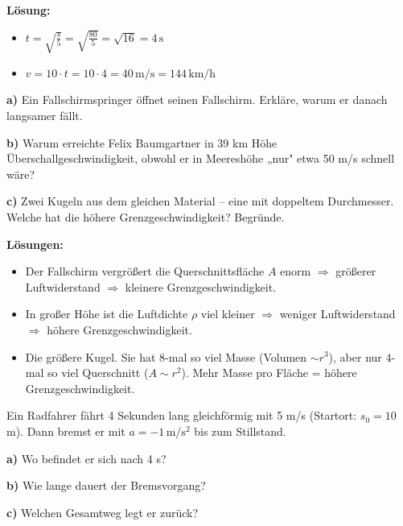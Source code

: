 \documentclass[11pt,a4paper]{article}
\begin{document}
\textbf{Lösung:}
\begin{itemize}
\item[a)] $t = \sqrt{\frac{s}{5}} = \sqrt{\frac{80}{5}} = \sqrt{16} = 4\,\mathrm{s}$
\item[b)] $v = 10 \cdot t = 10 \cdot 4 = 40\,\mathrm{m/s} = 144\,\mathrm{km/h}$
\end{itemize}

\vspace{0.5cm}

\begin{aufgabe}
\textbf{a)} Ein Fallschirmspringer öffnet seinen Fallschirm. Erkläre, warum er danach langsamer fällt.

\textbf{b)} Warum erreichte Felix Baumgartner in 39 km Höhe Überschallgeschwindigkeit, obwohl er in Meereshöhe „nur" etwa 50 m/s schnell wäre?

\textbf{c)} Zwei Kugeln aus dem gleichen Material -- eine mit doppeltem Durchmesser. Welche hat die höhere Grenzgeschwindigkeit? Begründe.
\end{aufgabe}

\textbf{Lösungen:}
\begin{itemize}
\item[a)] Der Fallschirm vergrößert die Querschnittsfläche $A$ enorm $\Rightarrow$ größerer Luftwiderstand $\Rightarrow$ kleinere Grenzgeschwindigkeit.
\item[b)] In großer Höhe ist die Luftdichte $\rho$ viel kleiner $\Rightarrow$ weniger Luftwiderstand $\Rightarrow$ höhere Grenzgeschwindigkeit.
\item[c)] Die größere Kugel. Sie hat 8-mal so viel Masse (Volumen $\sim r^3$), aber nur 4-mal so viel Querschnitt ($A \sim r^2$). Mehr Masse pro Fläche = höhere Grenzgeschwindigkeit.
\end{itemize}

\vspace{0.5cm}

\begin{aufgabe}
Ein Radfahrer fährt 4 Sekunden lang gleichförmig mit 5 m/s (Startort: $s_0 = 10$ m). Dann bremst er mit $a = -1\,\mathrm{m/s^2}$ bis zum Stillstand.

\textbf{a)} Wo befindet er sich nach 4 s?

\textbf{b)} Wie lange dauert der Bremsvorgang?

\textbf{c)} Welchen Gesamtweg legt er zurück?
\end{aufgabe}
\end{document}

